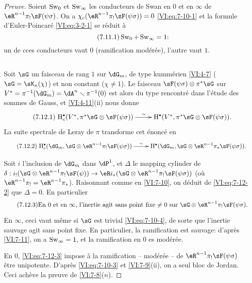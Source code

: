 \begin{proof}[Preuve]
Soient $\operatorname{Sw}_0$ et $\operatorname{Sw}_\infty$ les conducteurs de Swan en $0$ et en 
$\infty$ de $\eR^{n-1} \pi_! \sF(\psi\sigma)$. On a 
$\chi_c(\eR^{n-1} \pi_! \sF(\psi\sigma))=0$ \eqref{VI:eq:7-10-1} et la formule 
d'Euler-Poincar\'e \eqref{VI:eq:3-2-1} se r\'eduit \`a 
\begin{equation*}\tag{7.11.1}\label{VI:eq:7-11-1}
  \operatorname{Sw}_0 + \operatorname{Sw}_\infty =1 \text{:} 
\end{equation*}
un de cces conducteurs vaut $0$ (ramification mod\'er\'ee), l'autre vaut $1$. 





\subsection{}\label{VI:7-12}

Soit $\sG$ un faisceau de rang $1$ sur $\dG_m$, de type kumm\'erien 
\ref{VI:4-7} ($\sG=\sK_n(\chi)$) et non constant ($\chi\ne 1$). Le faisceau 
$\sF(\psi\sigma)\otimes \pi^\ast \sG$ sur 
$V^\ast=\pi^{-1}(\dG_m) = \dA^n\setminus \pi^{-1}(0)$ est alors du type 
rencontr\'e dans l'\'etude des sommes de Gauss, et \ref{VI:4-11}(ii) nous donne 
\begin{equation*}\tag{7.12.1}\label{VI:eq:7-12-1}
\xymatrix{
  \h_c^\bullet(V^\ast,\pi^\ast\sG\otimes \sF(\psi\sigma)) \ar[r]^-\sim 
    & \h^\bullet(V^\ast,\pi^\ast \sG\otimes \sF(\psi\sigma)) \text{.} 
}
\end{equation*}
La suite spectrale de Leray de $\pi$ transforme cet \'enonc\'e en 
\begin{equation*}\tag{7.12.2}\label{VI:eq:7-12-2}
\xymatrix{
  \h_c^\bullet(\dG_m,\sG\otimes \eR^{n-1} \pi_! \sF(\psi\sigma)) \ar[r]^-\sim 
    & \h^\bullet(\dG_m,\sG\otimes \eR^{n-1} \pi_\ast \sF(\psi\sigma)) \text{.} 
}
\end{equation*}

Soit $i$ l'inclusion de $\dG_m$ dans $\dP^1$, et $\Delta$ le mapping cylinder 
de 
$\delta:i_!(\sG\otimes \eR^{n-1}\pi_! \sF(\psi))\to \eR i_\ast (\sG\otimes \eR^{n-1} \pi_! \sF(\psi\sigma))$
(o\`u $\eR^{n-1} \pi_! = \eR^{n-1}\pi_\ast$). Raisonnant comme en 
\ref{VI:7-10}, on d\'eduit de \eqref{VI:eq:7-12-2} que $\Delta=0$. En 
particulier 
\begin{equation*}\tag{7.12.3}\label{VI:eq:7-12-3}
  \text{En $0$ et en $\infty$, l'inertie agit sans point fixe $\ne 0$ sur $\sG\otimes \eR^{n-1}\pi_! \sF(\psi\sigma)$.}
\end{equation*}

En $\infty$, ceci vaut m\^eme si $\sG$ est trivial \eqref{VI:eq:7-10-4}, de 
sorte que l'inertie sauvage agit sans point fixe. En particulier, la 
ramification est sauvage: d'apr\`es \ref{VI:7-11}, on a $\operatorname{Sw}_\infty=1$, et la 
ramification en $0$ es mod\'er\'ee. 

En $0$, \eqref{VI:eq:7-12-3} impose \`a la ramification -- mod\'er\'ee -- de 
$\eR^{n-1} \pi_! \sF(\psi\sigma)$ \^etre unipotente. D'apr\`es 
\eqref{VI:eq:7-10-3} et \ref{VI:7-9}(ii), on a seul bloc de Jordan. Ceci 
ach\`eve la preuve de \ref{VI:7-8}($n$). 
\end{proof}





